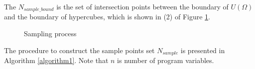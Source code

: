 The $N_{sample\_bound}$ is the set of intersection points between the boundary of $U(\Omega)$ and the boundary of hypercubes, which is shown in (2) of Figure \ref{sample points}.
\begin{figure}[H]
	\caption{Sampling process}
	\label{sample points}
\end{figure}
The procedure to construct the sample points set ${N_{sample}}$ is presented in Algorithm \ref{algorithm1}. Note that $n$ is number of program variables.


